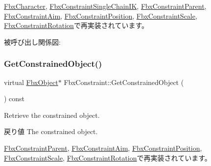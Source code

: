 \hyperlink{class_fbx_character_ae66db4ff3c527db3c47064c700ce179a}{Fbx\+Character}, \hyperlink{class_fbx_constraint_single_chain_i_k_aeffab44c49ad72283bdb07e50e9baf77}{Fbx\+Constraint\+Single\+Chain\+IK}, \hyperlink{class_fbx_constraint_parent_af968ae8a08629c4c259ec70ce2697c0e}{Fbx\+Constraint\+Parent}, \hyperlink{class_fbx_constraint_aim_a295c1f47dce7a051886dc6b9bb68025f}{Fbx\+Constraint\+Aim}, \hyperlink{class_fbx_constraint_position_adb2f3e784d01313ecc859b7cda16c182}{Fbx\+Constraint\+Position}, \hyperlink{class_fbx_constraint_scale_af34ea4ce8516d69aefbcb9e83060b2c1}{Fbx\+Constraint\+Scale}, \hyperlink{class_fbx_constraint_rotation_ad9f6469905777a18e3a383f402bdd9b0}{Fbx\+Constraint\+Rotation}で再実装されています。

被呼び出し関係図\+:
\mbox{\label{class_fbx_constraint_a7f587d5db9685b5ee925a85354263edc}} 
\subsubsection{\texorpdfstring{Get\+Constrained\+Object()}{GetConstrainedObject()}}
{\footnotesize\ttfamily virtual \hyperlink{class_fbx_object}{Fbx\+Object}$\ast$ Fbx\+Constraint\+::\+Get\+Constrained\+Object (\begin{DoxyParamCaption}{ }\end{DoxyParamCaption}) const\hspace{0.3cm}{\ttfamily [virtual]}}

Retrieve the constrained object. \begin{DoxyReturn}{戻り値}
The constrained object. 
\end{DoxyReturn}


\hyperlink{class_fbx_constraint_parent_a8c878a029a5628f328244f824d3f8847}{Fbx\+Constraint\+Parent}, \hyperlink{class_fbx_constraint_aim_a7245132b757540df762f9b37dae533cf}{Fbx\+Constraint\+Aim}, \hyperlink{class_fbx_constraint_position_a2722540075ef79aa2d14e7e838afaf79}{Fbx\+Constraint\+Position}, \hyperlink{class_fbx_constraint_scale_a1dcbdc6b41d04d6a75ca47f024e05dc9}{Fbx\+Constraint\+Scale}, \hyperlink{class_fbx_constraint_rotation_ad9bdaf083716c730fdd907a9387e4991}{Fbx\+Constraint\+Rotation}で再実装されています。

\mbox{\label{class_fbx_constraint_a5ff6fe6fc98af1e33e8b297bc1cea007}} 
